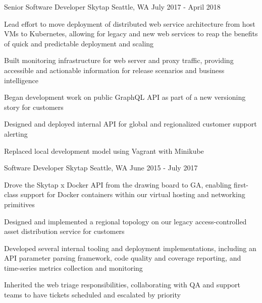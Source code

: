 \begin{cventries}
  \cventry
    {Senior Software Developer} %
    {Skytap} %
    {Seattle, WA} %
    {July 2017 - April 2018} %
    {
      \begin{cvitems} %
        \item {Lead effort to move deployment of distributed web service architecture from host VMs to Kubernetes, allowing for legacy and new web services to reap the benefits of quick and predictable deployment and scaling}
        \item {Built monitoring infrastructure for web server and proxy traffic, providing accessible and actionable information for release scenarios and business intelligence}
        \item {Began development work on public GraphQL API as part of a new versioning story for customers}
        \item {Designed and deployed internal API for global and regionalized customer support alerting}
        \item {Replaced local development model using Vagrant with Minikube}
      \end{cvitems}
    }

  \cventry
    {Software Developer} %
    {Skytap} %
    {Seattle, WA} %
    {June 2015 - July 2017} %
    {
      \begin{cvitems} %
        \item {Drove the Skytap x Docker API from the drawing board to GA, enabling first-class support for Docker containers within our virtual hosting and networking primitives}
        \item {Designed and implemented a regional topology on our legacy access-controlled asset distribution service for customers}
        \item {Developed several internal tooling and deployment implementations, including an API parameter parsing framework, code quality and coverage reporting, and time-series metrics collection and monitoring}
        \item {Inherited the web triage responsibilities, collaborating with QA and support teams to have tickets scheduled and escalated by priority}
      \end{cvitems}
    }

\end{cventries}
